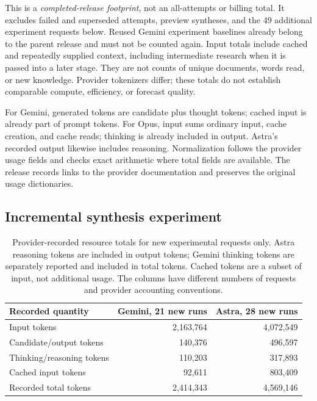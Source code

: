 \documentclass[11pt]{article}
\begin{document}
This is a \emph{completed-release footprint}, not an all-attempts or billing total. It excludes failed and superseded attempts, preview syntheses, and the 49 additional experiment requests below. Reused Gemini experiment baselines already belong to the parent release and must not be counted again. Input totals include cached and repeatedly supplied context, including intermediate research when it is passed into a later stage. They are not counts of unique documents, words read, or new knowledge. Provider tokenizers differ; these totals do not establish comparable compute, efficiency, or forecast quality.

For Gemini, generated tokens are candidate plus thought tokens; cached input is already part of prompt tokens. For Opus, input sums ordinary input, cache creation, and cache reads; thinking is already included in output. Astra's recorded output likewise includes reasoning. Normalization follows the provider usage fields and checks exact arithmetic where total fields are available. The release records links to the provider documentation and preserves the original usage dictionaries.

\clearpage
\subsection{Incremental synthesis experiment}
\begin{table}[H]
\centering\small
\begin{tabular}{@{}lrr@{}}
\toprule
Recorded quantity & Gemini, 21 new runs & Astra, 28 new runs \\
\midrule
Input tokens & 2,163,764 & 4,072,549 \\
Candidate/output tokens & 140,376 & 496,597 \\
Thinking/reasoning tokens & 110,203 & 317,893 \\
Cached input tokens & 92,611 & 803,409 \\
Recorded total tokens & 2,414,343 & 4,569,146 \\
\bottomrule
\end{tabular}
\caption{Provider-recorded resource totals for new experimental requests only. Astra reasoning tokens are included in output tokens; Gemini thinking tokens are separately reported and included in total tokens. Cached tokens are a subset of input, not additional usage. The columns have different numbers of requests and provider accounting conventions.}
\end{table}
\end{document}
